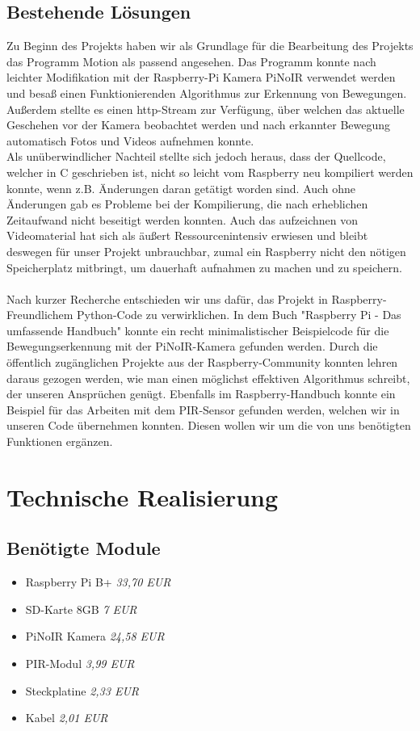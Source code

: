 \message{ !name(Verteilte Überwachung.tex)}\documentclass[12pt,a4paper]{scrreprt}
\begin{document}
\section{Bestehende Lösungen} 
Zu Beginn des Projekts haben wir als Grundlage für die Bearbeitung des Projekts das Programm Motion\cite{motion} als passend angesehen. Das Programm konnte nach leichter Modifikation mit der Raspberry-Pi Kamera PiNoIR verwendet werden und besaß einen Funktionierenden Algorithmus zur Erkennung von Bewegungen. Außerdem stellte es einen http-Stream zur Verfügung, über welchen das aktuelle Geschehen vor der Kamera beobachtet werden und nach erkannter Bewegung automatisch Fotos und Videos aufnehmen konnte. 
\\ 
Als unüberwindlicher Nachteil stellte sich jedoch heraus, dass der Quellcode, welcher in C geschrieben ist, nicht so leicht vom Raspberry neu kompiliert werden konnte, wenn z.B. Änderungen daran getätigt worden sind. Auch ohne Änderungen gab es Probleme bei der Kompilierung, die nach erheblichen Zeitaufwand nicht beseitigt werden konnten. Auch das aufzeichnen von Videomaterial hat sich als äußert Ressourcenintensiv erwiesen und bleibt deswegen für unser Projekt unbrauchbar, zumal ein Raspberry nicht den nötigen Speicherplatz mitbringt, um dauerhaft aufnahmen zu machen und zu speichern.
\\ \\
Nach kurzer Recherche entschieden wir uns dafür, das Projekt in Raspberry-Freundlichem Python-Code zu verwirklichen.
In dem Buch "Raspberry Pi - Das umfassende Handbuch" konnte ein recht minimalistischer Beispielcode für die Bewegungserkennung mit der PiNoIR-Kamera gefunden werden\cite[S. XXX]{Raspi}. Durch die öffentlich zugänglichen Projekte aus der Raspberry-Community konnten lehren daraus gezogen werden, wie man einen möglichst effektiven Algorithmus schreibt, der unseren Ansprüchen genügt. Ebenfalls im Raspberry-Handbuch konnte ein Beispiel für das Arbeiten mit dem PIR-Sensor gefunden werden\cite[S. 495]{Raspi}, welchen wir in unseren Code übernehmen konnten.
Diesen wollen wir um die von uns benötigten Funktionen ergänzen.


\chapter{Technische Realisierung}
\section{Benötigte Module}
\begin{itemize}
\item Raspberry Pi B+ \textit{33,70 EUR} 
\item SD-Karte 8GB \textit{7 EUR}
\item PiNoIR Kamera \textit{24,58 EUR}
\item PIR-Modul \textit{3,99 EUR}
\item Steckplatine \textit{2,33 EUR}
\item Kabel \textit{2,01 EUR}
\end{itemize}
\end{document}
